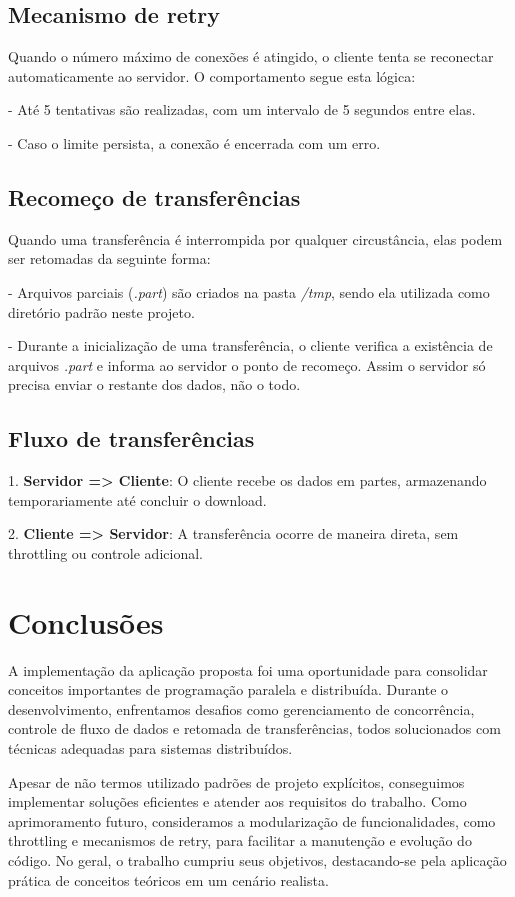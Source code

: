\documentclass{article}
\begin{document}
\subsection*{Mecanismo de retry}
Quando o número máximo de conexões é atingido, o cliente tenta se reconectar automaticamente ao servidor. O comportamento segue esta lógica:

- Até 5 tentativas são realizadas, com um intervalo de 5 segundos entre elas.

- Caso o limite persista, a conexão é encerrada com um erro.

\subsection*{Recomeço de transferências}
Quando uma transferência é interrompida por qualquer circustância, elas podem ser retomadas da seguinte forma:

- Arquivos parciais (\textit{.part}) são criados na pasta \textit{/tmp}, sendo ela utilizada como diretório padrão neste projeto.

- Durante a inicialização de uma transferência, o cliente verifica a existência de arquivos \textit{.part} e informa ao servidor o ponto de recomeço. Assim
o servidor só precisa enviar o restante dos dados, não o todo.

\subsection*{Fluxo de transferências}
1. \textbf{Servidor => Cliente}: O cliente recebe os dados em partes, armazenando temporariamente até concluir o download.

2. \textbf{Cliente => Servidor}: A transferência ocorre de maneira direta, sem throttling ou controle adicional.

\section*{Conclusões}

A implementação da aplicação proposta foi uma oportunidade para consolidar conceitos importantes de programação paralela e distribuída. Durante o
desenvolvimento, enfrentamos desafios como gerenciamento de concorrência, controle de fluxo de dados e retomada de transferências, todos solucionados
com técnicas adequadas para sistemas distribuídos. 

Apesar de não termos utilizado padrões de projeto explícitos, conseguimos implementar soluções eficientes e atender aos requisitos do trabalho.
Como aprimoramento futuro, consideramos a modularização de funcionalidades, como throttling e mecanismos de retry, para facilitar a manutenção e
evolução do código. No geral, o trabalho cumpriu seus objetivos, destacando-se pela aplicação prática de conceitos teóricos em um cenário realista.
\end{document}
